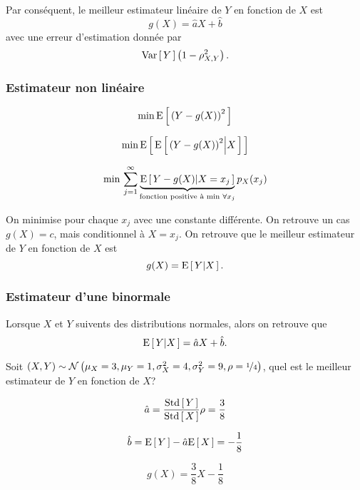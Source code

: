 \documentclass[11pt]{article}
\newcommand\BiNorm[5]{%
	\ensuremath{%
		\mathcal{N}\left(#1,#2,#3,#4,#5\right)%
	}%
}%
\newcommand\Esp[1]{%
	\ensuremath{%
		\mathrm{E}\left[\,#1\,\right]%
	}%
}%
\newcommand\Espg[2]{%
	\ensuremath{%
		\mathrm{E}\left[\,#1\middle\vert#2\,\right]%
	}%
}%
\newcommand\Var[1]{%
	\ensuremath{%
		\mathrm{Var}\left[\,#1\,\right]%
	}%
}%
\newcommand\Std[1]{%
	\ensuremath{%
		\mathrm{Std}\left[\,#1\,\right]%
	}%
}%
\newcommand\Min{
	\ensuremath{%
		\mathrm{min}\,%
	}%
}
\begin{document}
Par conséquent, le meilleur estimateur linéaire de $Y$ en fonction de $X$ est
\begin{equation*}
	g(X)=\hat{a}X+\hat{b}
\end{equation*}
avec une erreur d'estimation donnée par
\begin{equation*}
	\Var{Y}\left(1-\rho_{X,Y}^2\right).
\end{equation*}

\subsubsection{Estimateur non linéaire}
\begin{equation*}
	\Min\Esp{\left(Y-g(X)\right)^2}
\end{equation*}

\begin{equation*}
	\Min\Esp{\Espg{\left(Y-g(X)\right)^2}{X}}
\end{equation*}

\begin{equation*}
	\Min\sum_{j=1}^\infty
		\underbrace{\Espg{Y-g(X)}{X=x_j}}_{\text{fonction positive à min $\forall x_j$}}
		p_X(x_j)
\end{equation*}

On minimise pour chaque $x_j$ avec une constante différente. On retrouve un cas
$g(X)=c$, mais conditionnel à $X=x_j$. On retrouve que le meilleur estimateur
de $Y$ en fonction de $X$ est
\begin{equation*}
	g(X)=\Espg{Y}{X}.
\end{equation*}

\subsubsection{Estimateur d'une binormale}
Lorsque $X$ et $Y$ suivents des distributions normales, alors on retrouve que
\begin{equation*}
	\Espg{Y}{X}=\hat{a}X+\hat{b}.
\end{equation*}

\begin{exemple}
	Soit $(X,Y)\sim\BiNorm{\mu_X=3}{\mu_Y=1}{\sigma_X^2=4}{\sigma_Y^2=9}{\rho=\nicefrac{1}{4}}$,
	quel est le meilleur estimateur de $Y$ en fonction de $X$?

	\begin{equation*}
		\hat{a}=\frac{\Std{Y}}{\Std{X}}\rho=\frac{3}{8}
	\end{equation*}

	\begin{equation*}
		\hat{b}=\Esp{Y}-\hat{a}\Esp{X}=-\frac{1}{8}
	\end{equation*}

	\begin{equation*}
		g(X)=\frac{3}{8}X-\frac{1}{8}
	\end{equation*}
\end{exemple}
\end{document}
